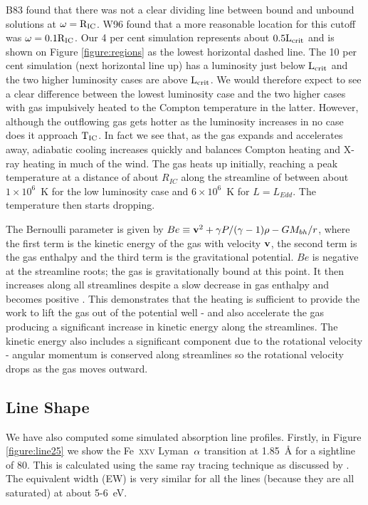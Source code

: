 \documentclass[a4paper,fleqn,usenatbib]{mnras}
\begin{document}
B83 found that there was not a clear dividing line between bound and unbound solutions 
at $\rm{\omega=R_{IC}}$. W96 found that a more reasonable location for this cutoff was 
$\rm{\omega=0.1 R_{IC}}$.
Our 4 per cent simulation represents about $\rm{0.5 L_{crit}}$ and is shown on Figure \ref{figure:regions} as the lowest 
horizontal dashed line. The 10 per cent simulation (next horizontal line up) has a luminosity just below $\rm{L_{crit}}$ 
and
the two higher luminosity cases are above $\rm{L_{crit}}$. We would therefore expect to see a clear difference between the lowest luminosity case and the two higher cases with gas impulsively heated to the Compton
temperature in the latter. However, although the outflowing gas gets hotter as the luminosity increases in no
case does it approach $\rm{T_{IC}}$. In fact we see that, as the gas expands and accelerates
away, adiabatic cooling increases quickly and balances Compton heating and X-ray heating in much of the wind. The gas heats up initially, reaching a peak temperature at a distance of about $R_{IC}$ along the streamline of between
about $1\times10^6$~K for the low luminosity case and $6\times10^6$~K for $L=L_{Edd}$. The temperature then starts dropping. 

The Bernoulli parameter is given by $Be\equiv\bold{v}^2+\gamma P/(\gamma-1)\rho-GM_{bh}/r$, where the first
term is the kinetic energy of the gas with velocity $\bold{v}$, the second term is the gas enthalpy and the third
term is the gravitational potential. $Be$ is negative at the streamline roots; the gas is gravitationally bound at 
this point. It then increases along all streamlines despite a slow decrease in gas enthalpy and becomes positive
. 
This demonstrates that the heating is
sufficient to provide the work to lift the gas out of the potential well - and also accelerate the gas producing a
significant increase in kinetic energy along the streamlines. The kinetic energy also includes a significant component
due to the rotational velocity - angular momentum is conserved along streamlines so the rotational velocity drops 
as the gas moves outward.






\subsection{Line Shape}
\label{section:line_shape}
We have also computed some simulated absorption line profiles.
Firstly, in Figure \ref{figure:line25} we show the Fe~\textsc{xxv} Lyman~$\rm{\alpha}$ transition at 1.85~{\AA} for a 
sightline  of 80\degree . This is calculated using the same ray tracing technique as discussed 
by \cite{2015ApJ...807..107H}. The equivalent width (EW) is very similar for all the lines (because they are all 
saturated) at about 5-6~eV. 
\end{document}
